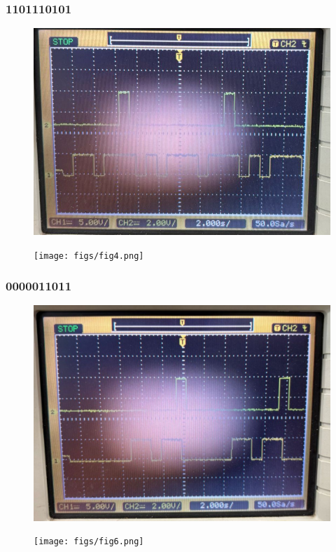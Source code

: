 \documentclass{article}
\begin{document}
\subsubsection{1101110101}
\begin{figure}[h!]
    \centering
    \includegraphics[width=0.7\linewidth]{figs/fig3.png}
    \label{fig:enter-label}
\end{figure}
\begin{figure}[h!]
    \centering
    \texttt{[image: figs/fig4.png]}
    \label{fig:enter-label}
\end{figure}
\pagebreak
\subsubsection{0000011011}
\begin{figure}[h!]
    \centering
    \includegraphics[width=0.7\linewidth]{figs/fig5.png}
    \label{fig:enter-label}
\end{figure}
\begin{figure}[h!]
    \centering
    \texttt{[image: figs/fig6.png]}
    \label{fig:enter-label}
\end{figure}
\pagebreak
\end{document}
